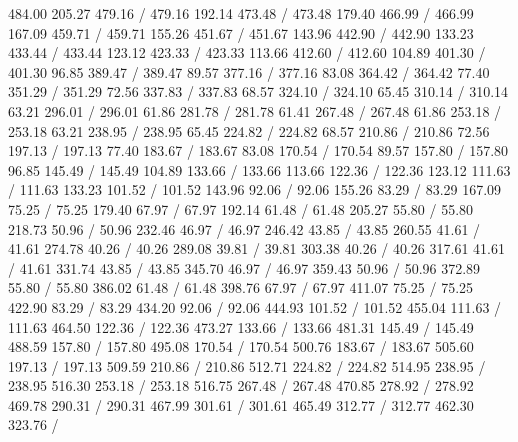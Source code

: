 { 484.00 205.27 479.16 /
 479.16 192.14 473.48 /
 473.48 179.40 466.99 /
 466.99 167.09 459.71 /
 459.71 155.26 451.67 /
 451.67 143.96 442.90 /
 442.90 133.23 433.44 /
 433.44 123.12 423.33 /
 423.33 113.66 412.60 /
 412.60 104.89 401.30 /
 401.30 96.85 389.47 /
 389.47 89.57 377.16 /
 377.16 83.08 364.42 /
 364.42 77.40 351.29 /
 351.29 72.56 337.83 /
 337.83 68.57 324.10 /
 324.10 65.45 310.14 /
 310.14 63.21 296.01 /
 296.01 61.86 281.78 /
 281.78 61.41 267.48 /
 267.48 61.86 253.18 /
 253.18 63.21 238.95 /
 238.95 65.45 224.82 /
 224.82 68.57 210.86 /
 210.86 72.56 197.13 /
 197.13 77.40 183.67 /
 183.67 83.08 170.54 /
 170.54 89.57 157.80 /
 157.80 96.85 145.49 /
 145.49 104.89 133.66 /
 133.66 113.66 122.36 /
 122.36 123.12 111.63 /
 111.63 133.23 101.52 /
 101.52 143.96 92.06 /
 92.06 155.26 83.29 /
 83.29 167.09 75.25 /
 75.25 179.40 67.97 /
 67.97 192.14 61.48 /
 61.48 205.27 55.80 /
 55.80 218.73 50.96 /
 50.96 232.46 46.97 /
 46.97 246.42 43.85 /
 43.85 260.55 41.61 /
 41.61 274.78 40.26 /
 40.26 289.08 39.81 /
 39.81 303.38 40.26 /
 40.26 317.61 41.61 /
 41.61 331.74 43.85 /
 43.85 345.70 46.97 /
 46.97 359.43 50.96 /
 50.96 372.89 55.80 /
 55.80 386.02 61.48 /
 61.48 398.76 67.97 /
 67.97 411.07 75.25 /
 75.25 422.90 83.29 /
 83.29 434.20 92.06 /
 92.06 444.93 101.52 /
 101.52 455.04 111.63 /
 111.63 464.50 122.36 /
 122.36 473.27 133.66 /
 133.66 481.31 145.49 /
 145.49 488.59 157.80 /
 157.80 495.08 170.54 /
 170.54 500.76 183.67 /
 183.67 505.60 197.13 /
 197.13 509.59 210.86 /
 210.86 512.71 224.82 /
 224.82 514.95 238.95 /
 238.95 516.30 253.18 /
 253.18 516.75 267.48 /
\setsolid
{} 267.48 470.85 278.92 /
 278.92 469.78 290.31 /
 290.31 467.99 301.61 /
 301.61 465.49 312.77 /
 312.77 462.30 323.76 /
}
